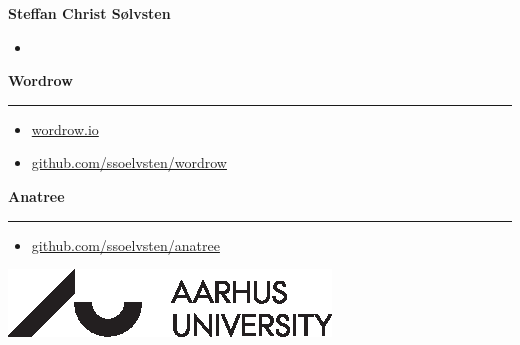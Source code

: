 \documentclass[english, aspectratio=169]{beamer}
\begin{document}
\begin{frame}
  {\Large \textbf{Steffan Christ Sølvsten}}

  \begin{itemize}
  \item[\faIcon{envelope}] 
  \end{itemize}

  \vspace{10pt}

  {\Large \textbf{Wordrow}}
  \vspace{1pt} {\hrule width0.45\linewidth}

  \vspace{5pt}

  \begin{itemize}
  \item[\faIcon{dice}\hspace{2pt}]
    \href{http://wordrow.io}{wordrow.io}
  \item[\faIcon{code}]
    \href{http://github.com/ssoelvsten/wordrow}{github.com/ssoelvsten/wordrow}
  \end{itemize}

  \vspace{10pt}

  {\Large \textbf{Anatree}}
  \vspace{1pt} {\hrule width0.45\linewidth}

  \vspace{5pt}

  \begin{itemize}
  \item[\faIcon{code}]
    \href{http://github.com/ssoelvsten/anatree}{github.com/ssoelvsten/anatree}
  \end{itemize}

  \vspace{10pt}

  \includegraphics[width=0.2\linewidth]{external/aulogo_uk_var2_black.eps}
\end{frame}
\end{document}
